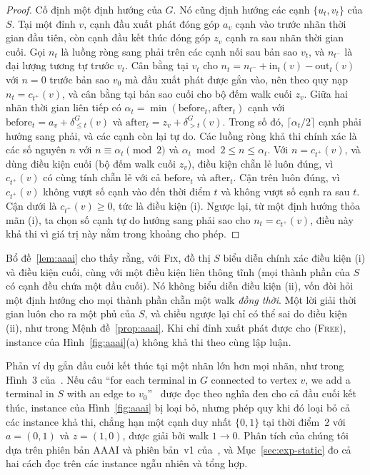 \documentclass[pdflatex,sn-mathphys-num]{sn-jnl}
\theoremstyle{thmstyleone}%
\theoremstyle{thmstyletwo}%
\theoremstyle{thmstylethree}%
\newcommand{\out}{\mathrm{out}}
\newcommand{\inn}{\mathrm{in}}
\newcommand{\FIX}{\textup{\textsc{Fix}}}
\newcommand{\FREE}{\textup{\textsc{Free}}}
\begin{document}
\begin{proof}
Cố định một định hướng của $G$. Nó cũng định hướng các cạnh $\{u_t,v_t\}$ của $S$. Tại một đỉnh $v$, cạnh đầu xuất phát đóng góp $a_v$ cạnh vào trước nhãn thời gian đầu tiên, còn cạnh đầu kết thúc đóng góp $z_v$ cạnh ra sau nhãn thời gian cuối. Gọi $n_t$ là luồng ròng sang phải trên các cạnh nối sau bản sao $v_t$, và $n_{t^-}$ là đại lượng tương tự trước $v_t$. Cân bằng tại $v_t$ cho $n_t=n_{t^-}+\inn_t(v)-\out_t(v)$ với $n=0$ trước bản sao $v_0$ mà đầu xuất phát được gắn vào, nên theo quy nạp $n_t=c_{t^+}(v)$, và cân bằng tại bản sao cuối cho bộ đếm walk cuối $z_v$. Giữa hai nhãn thời gian liên tiếp có $\alpha_t=\min(\mathrm{before}_t,\mathrm{after}_t)$ cạnh với $\mathrm{before}_t=a_v+\delta^G_{\le t}(v)$ và $\mathrm{after}_t=z_v+\delta^G_{>t}(v)$. Trong số đó, $\lceil\alpha_t/2\rceil$ cạnh phải hướng sang phải, và các cạnh còn lại tự do. Các luồng ròng khả thi chính xác là các số nguyên $n$ với $n\equiv\alpha_t \pmod 2$ và $\alpha_t \bmod 2\le n\le\alpha_t$. Với $n=c_{t^+}(v)$, và dùng điều kiện cuối (bộ đếm walk cuối $z_v$), điều kiện chẵn lẻ luôn đúng, vì $c_{t^+}(v)$ có cùng tính chẵn lẻ với cả $\mathrm{before}_t$ và $\mathrm{after}_t$. Cận trên luôn đúng, vì $c_{t^+}(v)$ không vượt số cạnh vào đến thời điểm $t$ và không vượt số cạnh ra sau $t$. Cận dưới là $c_{t^+}(v)\ge0$, tức là điều kiện (i). Ngược lại, từ một định hướng thỏa mãn (i), ta chọn số cạnh tự do hướng sang phải sao cho $n_t=c_{t^+}(v)$, điều này khả thi vì giá trị này nằm trong khoảng cho phép.
\end{proof}


Bổ đề~\ref{lem:aaai} cho thấy rằng, với \FIX{}, đồ thị $S$ biểu diễn chính xác điều kiện (i) và điều kiện cuối, cùng với một điều kiện liên thông tĩnh (mọi thành phần của $S$ có cạnh đều chứa một đầu cuối). Nó không biểu diễn điều kiện (ii), vốn đòi hỏi một định hướng cho mọi thành phần chẵn một walk \emph{đồng thời}. Một lời giải thời gian luôn cho ra một phủ của $S$, và chiều ngược lại chỉ có thể sai do điều kiện (ii), như trong Mệnh đề~\ref{prop:aaai}. Khi chỉ đỉnh xuất phát được cho (\FREE{}), instance của Hình~\ref{fig:aaai}(a) không khả thi theo cùng lập luận.

Phản ví dụ gắn đầu cuối kết thúc tại một nhãn lớn hơn mọi nhãn, như trong Hình~3 của~\cite{deligkas2025}. Nếu câu ``for each terminal in $G$ connected to vertex $v$, we add a terminal in $S$ with an edge to $v_0$''~\cite[tr.~26503]{deligkas2025} được đọc theo nghĩa đen cho cả đầu cuối kết thúc, instance của Hình~\ref{fig:aaai} bị loại bỏ, nhưng phép quy khi đó loại bỏ cả các instance khả thi, chẳng hạn một cạnh duy nhất $\{0,1\}$ tại thời điểm~$2$ với $a=(0,1)$ và $z=(1,0)$, được giải bởi walk $1\to0$. Phân tích của chúng tôi dựa trên phiên bản AAAI và phiên bản~v1 của~\cite{deligkas2024arxiv}, và Mục~\ref{sec:exp-static} đo cả hai cách đọc trên các instance ngẫu nhiên và tổng hợp.
\end{document}
